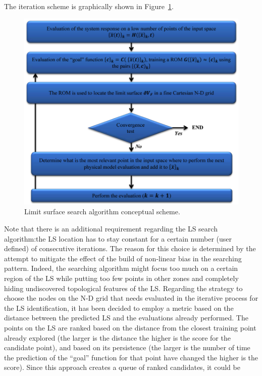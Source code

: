 The iteration scheme is graphically shown in
Figure~\ref{fig:LimitSurfaceAlgoFlow}.
\begin{figure}[h!]
  \centering
  \includegraphics[width=1.0\textwidth]  {pics/LimitSurfaceAlgoFlow.png}
  \caption{Limit surface search algorithm conceptual scheme.}
  \label{fig:LimitSurfaceAlgoFlow}
\end{figure}
Note that there is an additional requirement
regarding the LS search algorithm:the LS location
has to stay constant for a certain number (user defined) of consecutive
iterations. The reason for this choice is determined by the attempt to
mitigate the effect of the build of non-linear bias in the searching
pattern. Indeed, the searching algorithm might focus too much on a
certain region of the LS while putting too few points in other zones
and completely hiding undiscovered topological features of the LS.
Regarding the strategy to choose the nodes on the N-D grid that
needs evaluated in the iterative process for the LS identification, it has
been decided to employ a metric based on the
distance between the predicted LS and the evaluations already
performed. The points on the LS are ranked based on the distance
from the closest training point already explored (the larger is the
distance the higher is the score for the candidate point), and based on
its persistence (the larger is the number of time the prediction of the
``goal'' function for that point have changed the higher is the score).
Since this approach creates a queue of ranked candidates, it could be
